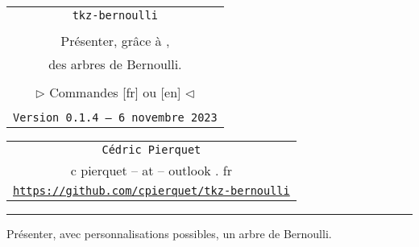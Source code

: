 \documentclass[french,11pt,a4paper]{article}
\def\TPversion{0.1.4}
\def\TPdate{6 novembre 2023}
\begin{document}
\pagestyle{fancy}

\thispagestyle{empty}

\begin{center}
	\begin{minipage}{0.88\linewidth}
	\begin{tcolorbox}[colframe=yellow,colback=yellow!15]
		\begin{center}
			\begin{tabular}{c}
				{\Huge \texttt{tkz-bernoulli}}\\
				\\
				{\LARGE Présenter, grâce à \MontreCode{tikz},} \\
				{\LARGE des arbres de Bernoulli.} \\
				\\
				{\LARGE $\rhd$ Commandes [fr] ou [en] $\lhd$} \\
				\\
				{\small \texttt{Version \TPversion{} -- \TPdate}}
		\end{tabular}
		\end{center}
	\end{tcolorbox}
\end{minipage}
\end{center}

\begin{center}
	\begin{tabular}{c}
		\texttt{Cédric Pierquet}\\
		{\ttfamily c pierquet -- at -- outlook . fr}\\
		\texttt{\url{https://github.com/cpierquet/tkz-bernoulli}} \\
	\end{tabular}
\end{center}

\hrule

\vfill

Présenter, avec personnalisations possibles, un arbre de Bernoulli.

\vfill

\begin{tcolorbox}[colframe=lightgray,colback=white]

\hfill\tkzSchemBernoulli*\hfill~
\end{tcolorbox}

\vspace*{5mm}
\end{document}

